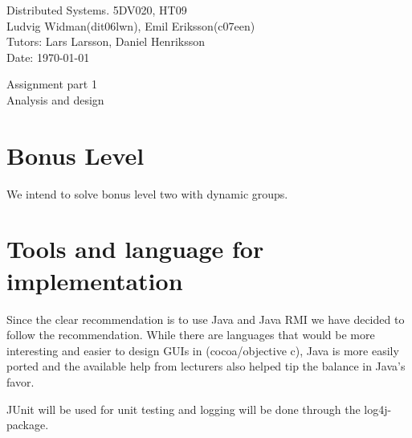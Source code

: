 \documentclass[english]{article}
\def\author			{Ludvig Widman(dit06lwn), Emil Eriksson(c07een)}
\def\course			{Distributed Systems. 5DV020, HT09}
\def\delivery		{Assignment part 1}
\def\trivialname	{Analysis and design}
\def\tutor			{Lars Larsson, Daniel Henriksson}
\begin{document}
\begin{titlepage}
\noindent
\course \\
\author \\

\noindent
Tutors: \tutor \\
Date: \today \\


\begin{center}
		\vspace{20mm}
        \Huge \delivery \\
        \vspace{5mm}
        \Huge \trivialname \\
        \vspace{70mm}
        
\end{center}
\end{titlepage}
\thispagestyle{empty}
\tableofcontents
\newpage
{}

\setlength{\parindent}{0pt}
\setlength{\parskip}{1ex plus 0.5ex minus 0.2ex}


\section{Bonus Level}
We intend to solve bonus level two with dynamic groups. 


\section{Tools and language for implementation}
Since the clear recommendation is to use Java and Java RMI we have decided to follow the recommendation. While there are languages that would be more interesting and easier to design GUIs in (cocoa/objective c), Java is more easily ported and the available help from lecturers also helped tip the balance in Java's favor.

JUnit will be used for unit testing and logging will be done through the log4j-package. 

\end{document}
